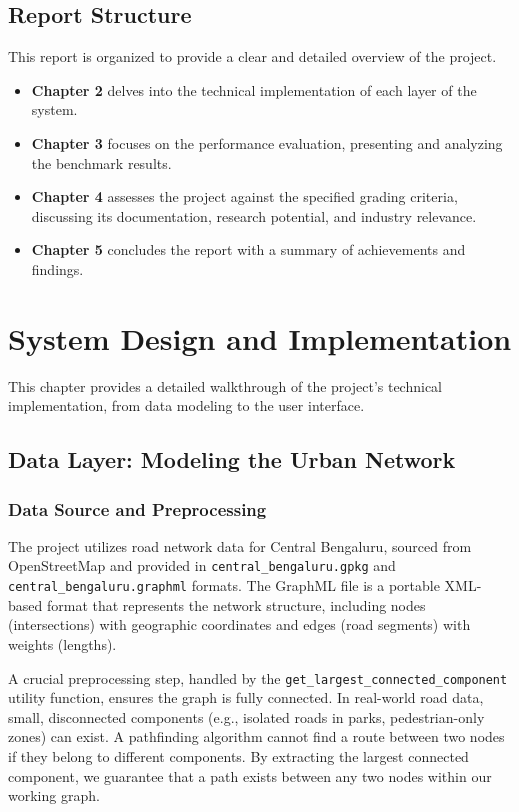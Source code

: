 \documentclass[12pt, a4paper]{report}
\begin{document}
\section{Report Structure}
This report is organized to provide a clear and detailed overview of the project.
\begin{itemize}
    \item \textbf{Chapter 2} delves into the technical implementation of each layer of the system.
    \item \textbf{Chapter 3} focuses on the performance evaluation, presenting and analyzing the benchmark results.
    \item \textbf{Chapter 4} assesses the project against the specified grading criteria, discussing its documentation, research potential, and industry relevance.
    \item \textbf{Chapter 5} concludes the report with a summary of achievements and findings.
\end{itemize}

\clearpage
\chapter{System Design and Implementation}

This chapter provides a detailed walkthrough of the project's technical implementation, from data modeling to the user interface.

\section{Data Layer: Modeling the Urban Network}

\subsection{Data Source and Preprocessing}
The project utilizes road network data for Central Bengaluru, sourced from OpenStreetMap and provided in \texttt{central\_bengaluru.gpkg} and \texttt{central\_bengaluru.graphml} formats. The GraphML file is a portable XML-based format that represents the network structure, including nodes (intersections) with geographic coordinates and edges (road segments) with weights (lengths).

A crucial preprocessing step, handled by the \texttt{get\_largest\_connected\_component} utility function, ensures the graph is fully connected. In real-world road data, small, disconnected components (e.g., isolated roads in parks, pedestrian-only zones) can exist. A pathfinding algorithm cannot find a route between two nodes if they belong to different components. By extracting the largest connected component, we guarantee that a path exists between any two nodes within our working graph.
\end{document}
